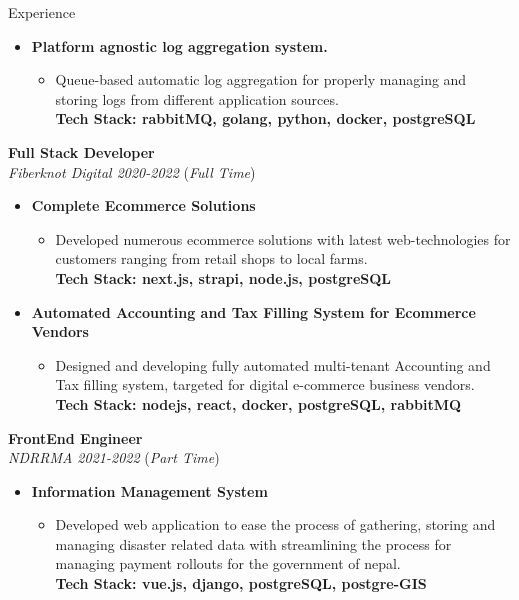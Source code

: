 \documentclass{resume} %
\begin{document}
\begin{rSection}{Experience}
\begin{itemize}
    \item \textbf{Platform agnostic log aggregation system.}
        \begin{itemize}
            \item Queue-based automatic log aggregation for properly managing and storing
            logs from different application sources.
            \\ \footnotesize{\textbf{Tech Stack: rabbitMQ, golang, python, docker, postgreSQL}}
        \end{itemize}
\end{itemize}

\large{{\bf Full Stack Developer}}
\\ \small{\textit{Fiberknot Digital 2020-2022}} (\small{\textit{Full Time}})
\begin{itemize}
    \item \textbf{Complete Ecommerce Solutions}
        \begin{itemize}
            \item Developed numerous ecommerce solutions with latest web-technologies for customers ranging from retail shops to local farms.
            \\ \footnotesize{\textbf{Tech Stack: next.js, strapi, node.js, postgreSQL }}
        \end{itemize}
\end{itemize}

\begin{itemize}
    \item \textbf{Automated Accounting and Tax Filling System for Ecommerce Vendors}
        \begin{itemize}
            \item Designed and developing fully automated multi-tenant Accounting and Tax filling system,
            targeted for digital e-commerce business vendors.
            \\ \footnotesize{\textbf{Tech Stack: nodejs, react, docker, postgreSQL, rabbitMQ }}
        \end{itemize}
\end{itemize}
\large{{\bf FrontEnd Engineer}}
\\ \small{\textit{NDRRMA 2021-2022}} (\small{\textit{Part Time}})

\begin{itemize}
    \item \textbf{Information Management System}
        \begin{itemize}
            \item Developed web application to ease the process of gathering, storing and managing disaster related data with streamlining the process for managing payment rollouts for the government of nepal.
            \\ \footnotesize{\textbf{Tech Stack: vue.js, django, postgreSQL, postgre-GIS }}
        \end{itemize}
\end{itemize}



\end{rSection}
\end{document}

